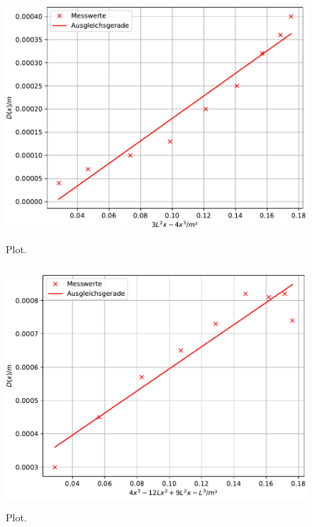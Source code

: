 



\begin{figure}
  \centering
  \includegraphics[width=12cm, height=9cm]{./plots/Stange3a.pdf}
  \caption{Plot.}
  \label{fig:plot}
\end{figure}





\begin{figure}
  \centering
  \includegraphics[width=12cm, height=9cm]{./plots/Stange3b.pdf}
  \caption{Plot.}
  \label{fig:plot}
\end{figure}
